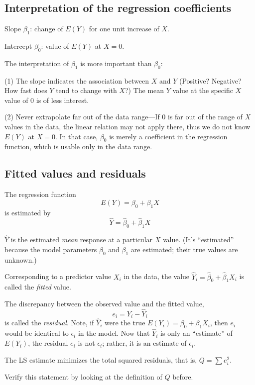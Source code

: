 \documentclass[12pt]{article}
\begin{document}
\subsection{Interpretation of the regression coefficients}

Slope $\beta_1$: change of $E(Y)$ for one unit increase of $X$.

Intercept $\beta_0$: value of $E(Y)$ at $X = 0$.

The interpretation of $\beta_1$ is more important than $\beta_0$:

(1) The slope indicates the association between $X$ and $Y$ (Positive?
Negative? How fast does $Y$ tend to change with $X$?)
The mean $Y$ value at the specific $X$ value of 0 is of less interest.

(2) Never extrapolate far out of the data range---If $0$
is far out of the range of $X$ values in the data, the linear relation
may not apply there, thus we do not know $E(Y)$ at $X=0$.
In that case, $\beta_0$ is merely a coefficient in the regression
function, which is usable only in the data range.

\subsection{Fitted values and residuals}

The regression function
\[
E(Y) = \beta_0 + \beta_1 X
\]
is estimated by
\[
\hat{Y} = \hat{\beta}_0 + \hat{\beta}_1 X
\]

$\hat{Y}$ is the estimated \emph{mean} response at a particular $X$ value.
(It's ``estimated'' because the model parameters $\beta_0$ and $\beta_1$
are estimated; their true values are unknown.)

Corresponding to a predictor value $X_i$ in the data,
the value $\hat{Y}_i = \hat{\beta}_0 + \hat{\beta}_1 X_i$
is called the \emph{fitted} value.

The discrepancy between the observed value and the fitted value,
\[
e_i = Y_i - \hat{Y}_i
\]
is called the \emph{residual}.
Note, if $\hat{Y}_i$ were the true $E(Y_i) = \beta_0 + \beta_1 X_i$,
then $e_i$ would be identical to $\epsilon_i$ in the model.
Now that $\hat{Y}_i$ is only an ``estimate'' of $E(Y_i)$,
the residual $e_i$ is not $\epsilon_i$; rather,
it is an estimate of $\epsilon_i$.

The LS estimate minimizes the total squared residuals,
that is, $Q = \sum e_i^2$.

\exercise
Verify this statement by looking at the definition of $Q$ before.
\end{document}
